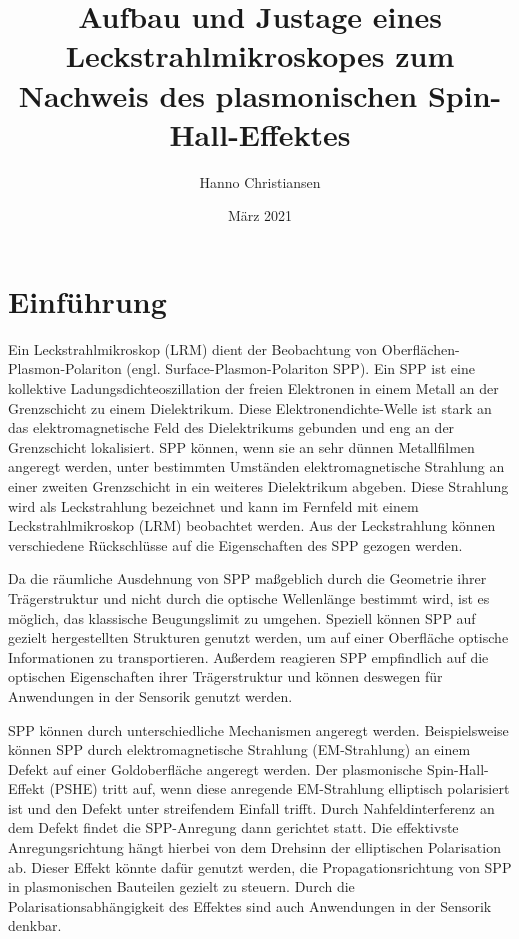 \documentclass[titlepage]{article}
\title{Aufbau und Justage eines Leckstrahlmikroskopes zum Nachweis des plasmonischen Spin-Hall-Effektes}
\author{Hanno Christiansen}
\date{März 2021}
\begin{document}
	
	\maketitle
	\tableofcontents
	\newpage
	
	\section{Einführung}
	Ein Leckstrahlmikroskop (LRM) dient der Beobachtung von Oberflächen-Plasmon-Polariton (engl. Surface-Plasmon-Polariton SPP). Ein SPP ist eine kollektive Ladungsdichteoszillation der freien Elektronen in einem Metall an der Grenzschicht zu einem Dielektrikum. Diese Elektronendichte-Welle ist stark an das elektromagnetische Feld des Dielektrikums gebunden und eng an der Grenzschicht lokalisiert. SPP können, wenn sie an sehr dünnen Metallfilmen angeregt werden, unter bestimmten Umständen elektromagnetische Strahlung an einer zweiten Grenzschicht in ein weiteres Dielektrikum abgeben. Diese Strahlung wird als Leckstrahlung bezeichnet und kann im Fernfeld mit einem Leckstrahlmikroskop (LRM) beobachtet werden. Aus der Leckstrahlung können verschiedene Rückschlüsse auf die Eigenschaften des SPP gezogen werden.\cite{Drezet.2008}
	
	Da die räumliche Ausdehnung von SPP maßgeblich durch die Geometrie ihrer Trägerstruktur und nicht durch die optische Wellenlänge bestimmt wird, ist es möglich, das klassische Beugungslimit zu umgehen. Speziell können SPP auf gezielt hergestellten Strukturen genutzt werden, um auf einer Oberfläche optische Informationen zu transportieren. Außerdem reagieren SPP empfindlich auf die optischen Eigenschaften ihrer Trägerstruktur und können deswegen für Anwendungen in der Sensorik genutzt werden.\cite{Lin.2013}
	
	SPP können durch unterschiedliche Mechanismen angeregt werden. Beispielsweise können SPP durch elektromagnetische Strahlung (EM-Strahlung) an einem Defekt auf einer Goldoberfläche angeregt werden. Der plasmonische Spin-Hall-Effekt (PSHE) tritt auf, wenn diese anregende EM-Strahlung elliptisch polarisiert ist und den Defekt unter streifendem Einfall trifft. Durch Nahfeldinterferenz an dem Defekt findet die SPP-Anregung dann gerichtet statt. Die effektivste Anregungsrichtung hängt hierbei von dem Drehsinn der elliptischen Polarisation ab. Dieser Effekt könnte dafür genutzt werden, die Propagationsrichtung von SPP in plasmonischen Bauteilen gezielt zu steuern. Durch die Polarisationsabhängigkeit des Effektes sind auch Anwendungen in der Sensorik denkbar.\cite{RodriguezFortuno.2013}
	
\end{document}
